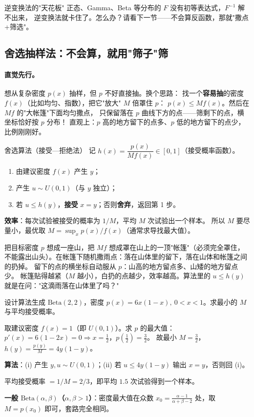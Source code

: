 \begin{wbox}{逆变换法的"天花板"}
正态、Gamma、Beta 等分布的 $F$ 没有初等表达式，$F^{-1}$ 解不出来，
逆变换法就卡住了。怎么办？请看下一节——不会算反函数，那就"撒点+筛选"。
\end{wbox}

\subsection{舍选抽样法：不会算，就用"筛子"筛}

\paragraph{直觉先行。}
想从复杂密度 $p(x)$ 抽样，但 $p$ 不好直接抽。换个思路：
找一个\textbf{容易抽}的密度 $f(x)$（比如均匀、指数），把它"放大" $M$ 倍罩住 $p$：
$p(x)\le Mf(x)$。然后在 $Mf$ 的"大帐篷"下面均匀撒点，
只保留落在 $p$ 曲线下方的点——筛剩下的点，横坐标恰好按 $p$ 分布！
直观上：$p$ 高的地方留下的点多、$p$ 低的地方留下的点少，比例刚刚好。

\begin{ebox}{舍选算法（接受—拒绝法）}
记 $h(x)=\dfrac{p(x)}{Mf(x)}\in[0,1]$（接受概率函数）。
\begin{enumerate}[leftmargin=2em]
  \item 由建议密度 $f(x)$ 产生 $y$；
  \item 产生 $u\sim U(0,1)$（与 $y$ 独立）；
  \item 若 $u\le h(y)$，\textbf{接受} $x=y$；否则\textbf{舍弃}，返回第 1 步。
\end{enumerate}
\textbf{效率}：每次试验被接受的概率为 $1/M$，平均 $M$ 次试验出一个样本。
所以 $M$ 要尽量小，最优取 $M=\sup_x p(x)/f(x)$（通常求导找最大值）。
\end{ebox}

\begin{pbox}
把目标密度 $p$ 想成一座山，把 $Mf$ 想成罩在山上的一顶"帐篷"（必须完全罩住，
不能露出山头）。在帐篷下随机撒雨点：落在山体里的留下，落在山体和帐篷之间的扔掉。
留下的点的横坐标自动服从 $p$：山高的地方留点多、山矮的地方留点少。
帐篷贴得越紧（$M$ 越小），白扔的点越少，效率越高。算法里的 $u\le h(y)$
就是在问："这滴雨落在山体里了吗？"
\end{pbox}

\begin{exbox}
设计算法生成 $\mathrm{Beta}(2,2)$，密度 $p(x)=6x(1-x),\ 0<x<1$。求最小的 $M$ 与平均接受概率。
\end{exbox}
\begin{sol}
取建议密度 $f(x)=1$（即 $U(0,1)$）。求 $p$ 的最大值：
$p'(x)=6(1-2x)=0\Rightarrow x=\frac12$，$p(\frac12)=\frac32$。
故最小 $M=\frac32$，$h(y)=\frac{p(y)}{M}=4y(1-y)$。

\textbf{算法}：(i) 产生 $y,u\sim U(0,1)$；(ii) 若 $u\le 4y(1-y)$ 输出 $x=y$，否则回 (i)。

平均接受概率 $=1/M=2/3$，即平均 $1.5$ 次试验得到一个样本。

\textbf{一般 $\mathrm{Beta}(\alpha,\beta)$（$\alpha,\beta>1$）}：密度最大值在众数
$x_0=\frac{\alpha-1}{\alpha+\beta-2}$ 处，取 $M=p(x_0)$ 即可，套路完全相同。
\end{sol}


